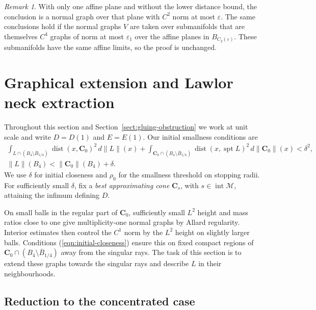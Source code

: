 \documentclass[11pt,a4paper]{article}
\numberwithin{equation}{section}
\theoremstyle{definition}
\theoremstyle{remark}
\newtheorem*{remark*}{Remark}
\newcommand{\dist}{\operatorname{dist}}
\newcommand{\dd}{\,d}
\begin{document}
	\begin{remark*}
		With only one affine plane and without the lower distance bound, the
		conclusion is a normal graph over that plane with $C^2$ norm at most
		$\varepsilon$.
		The same conclusions hold if the normal graphs $V$ are taken over
		submanifolds that are themselves $C^4$ graphs of norm at most $\varepsilon_1$
		over the affine planes in $B_{C_2(\varepsilon)}$.
		These submanifolds have the same affine limits, so the proof is unchanged.
	\end{remark*}
	
	
	\section{Graphical extension and Lawlor neck extraction}\label{sect:graphical-extension-lawlor-neck-extraction}
	
	Throughout this section and Section~\ref{sect:gluing-obstruction} we work at
	unit scale and write $D=D(1)$ and $E=E(1)$.
	Our initial smallness
	conditions are
	\begin{equation}\label{eqn:initial-closeness}
		\begin{gathered}
			\int_{L\cap(B_4\setminus\overline B_{1/4})}\dist(x,\mathbf C_0)^2\dd\|L\|(x)
			+\int_{\mathbf C_0\cap(B_4\setminus\overline B_{1/4})}
			\dist(x,\operatorname{spt}L)^2\dd\|\mathbf C_0\|(x)<\delta^2,\\
			\|L\|(B_4)<\|\mathbf C_0\|(B_4)+\delta.
		\end{gathered}
	\end{equation}
	We use $\delta$ for initial closeness and $\rho_0$ for the smallness
	threshold on stopping radii.
	For sufficiently small $\delta$, fix a \emph{best approximating cone}
	$\mathbf C_s$, with $s\in\operatorname{int}\mathcal M$, attaining
	the infimum defining $D$.
	
	On small balls in the regular part of $\mathbf C_0$, sufficiently small
	$L^2$ height and mass ratios close to one give multiplicity-one normal
	graphs by Allard regularity. Interior estimates then control the $C^1$
	norm by the $L^2$ height on slightly larger balls. Conditions
	(\ref{eqn:initial-closeness}) ensure this on fixed compact regions of
	$\mathbf C_0\cap(B_4\setminus\overline B_{1/4})$ away from the singular
	rays. The task of this section is to extend these graphs towards the
	singular rays and describe $L$ in their neighbourhoods.
	
	\subsection{Reduction to the concentrated case}
	\label{sect:concentration-reduction}
	
\end{document}

